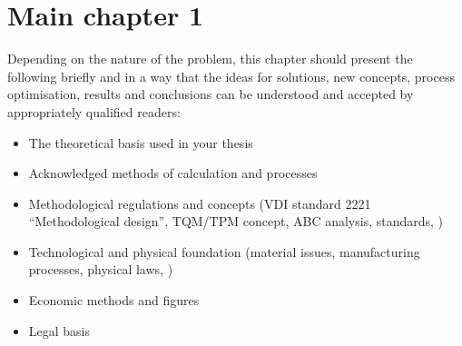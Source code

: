 \chapter{Main chapter 1}
Depending on the nature of the problem, this chapter should present the following briefly and in a way that the ideas for solutions, new concepts, process optimisation, results and conclusions can be understood and accepted by appropriately qualified readers:
\begin{itemize}
	\item The theoretical basis used in your thesis
	\item Acknowledged methods of calculation and processes
	\item Methodological regulations and concepts (\eg VDI standard 2221 ``Methodological design'', TQM/TPM concept, ABC analysis, standards, \etc)
	\item Technological and physical foundation (material issues, manufacturing processes, physical laws, \etc)
	\item Economic methods and figures
	\item Legal basis
\end{itemize}